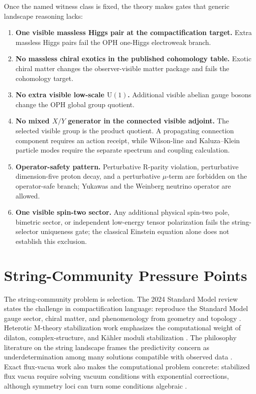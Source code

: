 \documentclass[11pt]{article}
\theoremstyle{remark}
\theoremstyle{plain}
\newcommand{\U}{\mathrm{U}}
\begin{document}
Once the named witness class is fixed, the theory makes gates that generic landscape reasoning lacks:
\begin{enumerate}[leftmargin=2em]
\item \textbf{One visible massless Higgs pair at the compactification target.} Extra massless Higgs pairs fail
the OPH one-Higgs electroweak branch.
\item \textbf{No massless chiral exotics in the published cohomology table.} Exotic chiral matter changes the observer-visible matter
package and fails the cohomology target.
\item \textbf{No extra visible low-scale \(\U(1)\).} Additional visible abelian gauge bosons change
the OPH global group quotient.
\item \textbf{No mixed \(X/Y\) generator in the connected visible adjoint.} The selected visible
group is the product quotient. A propagating connection component requires an action receipt, while
Wilson-line and Kaluza--Klein particle modes require the separate spectrum and coupling calculation.
\item \textbf{Operator-safety pattern.} Perturbative R-parity violation, perturbative
dimension-five proton decay, and a perturbative \(\mu\)-term are forbidden on the operator-safe
branch; Yukawas and the Weinberg neutrino operator are allowed.
\item \textbf{One visible spin-two sector.} Any additional physical spin-two pole, bimetric sector,
or independent low-energy tensor polarization fails the string-selector uniqueness gate; the
classical Einstein equation alone does not establish this exclusion.
\end{enumerate}

\section{String-Community Pressure Points}

The string-community problem is selection. The 2024 Standard Model review states the challenge in
compactification language: reproduce the Standard Model gauge sector, chiral matter, and
phenomenology from geometry and topology \cite{MarchesanoShiuWeigand2024}. Heterotic
M-theory stabilization work emphasizes the computational weight of dilaton, complex-structure,
and K\"ahler moduli stabilization \cite{DeffayetOvrutSteinhardt2024}. The philosophy literature
on the string landscape frames the predictivity concern as underdetermination among many
solutions compatible with observed data \cite{FriederichLeBihan2021}.
Exact flux-vacua work also makes the computational problem concrete: stabilized flux vacua
require solving vacuum conditions with exponential corrections, although symmetry loci can turn
some conditions algebraic \cite{GrimmVanDeHeisteeg2025}.
\end{document}
